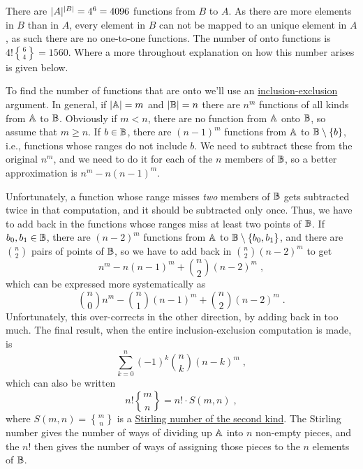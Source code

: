 \documentclass[a4paper, english, 12pt]{article} %
\begin{document}
\begin{problem}
  There are $\lvert A\rvert^{\lvert B\rvert} = 4^6 = 4096$ functions from $B$ to $A$. As there
  are more elements in $B$ than in $A$, every element in $B$ can not be mapped
  to an unique element in $A$, as such there are no one-to-one functions. The
  number of onto functions is $4! {6 \brace 4} = 1560$. Where a more throughout
  explanation on how this number arises is given below.

  To find the number of functions that are onto we’ll use an
  \href{https://en.wikipedia.org/wiki/Inclusion\%E2\%80\%93exclusion_principle}{inclusion-exclusion}
  argument. In general, if $\lvert\Bbb A\rvert = m$ and $\lvert\Bbb B\rvert = n$ there are
  $n^m$ functions of all kinds from $\Bbb A$ to $\Bbb B$. Obviously if $m<n$,
  there are no function from $\Bbb A$ onto $\Bbb B$, so assume that $m\ge n$. If
  $b\in\Bbb B$, there are $(n-1)^m$ functions from $\Bbb A$ to $\Bbb
  B\setminus\{b\}$, i.e., functions whose ranges do not include $b$. We need to
  subtract these from the original $n^m$, and we need to do it for each of the
  $n$ members of $\Bbb B$, so a better approximation is $n^m-n(n-1)^m$.

  Unfortunately, a function whose range misses \emph{two} members of $\Bbb B$ gets
  subtracted twice in that computation, and it should be subtracted only once.
  Thus, we have to add back in the functions whose ranges miss at least two
  points of $\Bbb B$. If $b_0,b_1\in\Bbb B$, there are $(n-2)^m$ functions from
  $\Bbb A$ to $\Bbb B\setminus\{b_0,b_1\}$, and there are $\binom{n}{2}$ pairs
  of points of $\Bbb B$, so we have to add back in $\binom{n}2(n-2)^m$ to get
  \begin{equation*}
    n^m-n(n-1)^m+\binom{n}2(n-2)^m\;,
  \end{equation*}
  which can be expressed more systematically as
  \begin{equation*}
    \binom{n}0n^m-\binom{n}1(n-1)^m+\binom{n}2(n-2)^m\;.
  \end{equation*}
  Unfortunately, this over-corrects in the other direction, by adding back in
  too much. The final result, when the entire inclusion-exclusion computation is
  made, is
  \begin{equation*}
    \sum_{k=0}^n(-1)^k\binom{n}k(n-k)^m\;,
  \end{equation*}
  which can also be written
  \begin{equation*}
    n!{m\brace n} = n! \cdot S(m,n)\;,
  \end{equation*}
  where $S(m,n) = {m\brace n}$ is a
  \href{http://en.wikipedia.org/wiki/Stirling_numbers_of_the_second_kind}{Stirling
    number of the second kind}. The Stirling number gives the number of ways of
  dividing up $\Bbb A$ into $n$ non-empty pieces, and the $n!$ then gives the
  number of ways of assigning those pieces to the $n$ elements of $\Bbb B$.
\end{problem}
\end{document}
